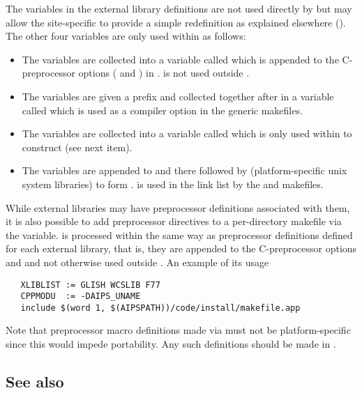The  variables in the external library definitions are not used
directly by  but may allow the site-specific 
to provide a simple redefinition as explained elsewhere ().
The other four variables are only used within  as follows:
\begin{itemize}
\item
   The  variables are collected into a variable called
    which is appended to the C-preprocessor options
   ( and ) in .  
   is not used outside .
\item
   The  variables are given a  prefix and collected
   together after  in a variable called
    which is used as a compiler option in the generic
   makefiles.
\item
   The  variables are collected into a variable called
    which is only used within  to construct
    (see next item).
\item
   The  variables are appended to  and there
   followed by  (platform-specific unix system libraries)
   to form .   is used in the link list by the
    and  makefiles.
\end{itemize}

While external libraries may have preprocessor definitions associated with
them, it is also possible to add preprocessor directives to a per-directory
makefile via the  variable.   is processed within
 the same way as preprocessor definitions defined for each
external library, that is, they are appended to the C-preprocessor options
 and  and not otherwise used outside
.  An example of its usage

\begin{verbatim}
   XLIBLIST := GLISH WCSLIB F77
   CPPMODU  := -DAIPS_UNAME
   include $(word 1, $(AIPSPATH))/code/install/makefile.app
\end{verbatim}

\noindent
Note that preprocessor macro definitions made via  must not be
platform-specific since this would impede portability.  Any such definitions
should be made in .

\subsection*{See also}

